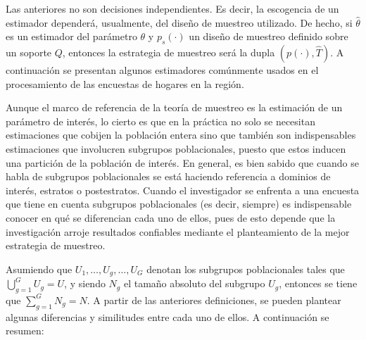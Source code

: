 \documentclass[
  12pt,
  spanish,
]{book}
\begin{document}
Las anteriores no son decisiones independientes. Es decir, la escogencia de un estimador dependerá, usualmente, del diseño de muestreo utilizado. De hecho, si \(\hat\theta\) es un estimador del parámetro \(\theta\) y \(p_s(\cdot)\) un diseño de muestreo definido sobre un soporte \(Q\), entonces la estrategia de muestreo será la dupla \((p(\cdot),\hat{T})\). A continuación se presentan algunos estimadores comúnmente usados en el procesamiento de las encuestas de hogares en la región.

Aunque el marco de referencia de la teoría de muestreo es la estimación de un parámetro de interés, lo cierto es que en la práctica no solo se necesitan estimaciones que cobijen la población entera sino que también son indispensables estimaciones que involucren subgrupos poblacionales, puesto que estos inducen una partición de la población de interés. En general, es bien sabido que cuando se habla de subgrupos poblacionales se está haciendo referencia a dominios de interés, estratos o postestratos. Cuando el investigador se enfrenta a una encuesta que tiene en cuenta subgrupos poblacionales (es decir, siempre) es indispensable conocer en qué se diferencian cada uno de ellos, pues de esto depende que la investigación arroje resultados confiables mediante el planteamiento de la mejor estrategia de muestreo.

Asumiendo que \(U_1, \ldots, U_g, \ldots, U_G\) denotan los subgrupos poblacionales tales que \(\bigcup_{g=1}^GU_g=U\), y siendo \(N_g\) el tamaño absoluto del subgrupo \(U_g\), entonces se tiene que \(\sum_{g=1}^G N_g=N\). A partir de las anteriores definiciones, se pueden plantear algunas diferencias y similitudes entre cada uno de ellos. A continuación se resumen:
\end{document}

